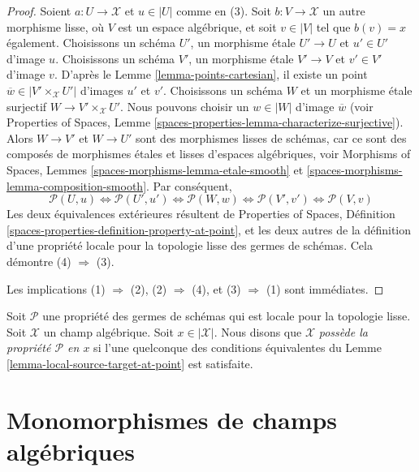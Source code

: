 \begin{proof}
Soient $a : U \to \mathcal{X}$ et $u \in |U|$ comme en (3). Soit
$b : V \to \mathcal{X}$ un autre morphisme lisse, où $V$ est un espace
algébrique, et soit $v \in |V|$ tel que $b(v) = x$ également.
Choisissons un schéma $U'$, un morphisme \'etale $U' \to U$ et $u' \in U'$
d'image $u$. Choisissons un schéma $V'$, un morphisme \'etale $V' \to V$
et $v' \in V'$ d'image $v$. D'après le
Lemme \ref{lemma-points-cartesian},
il existe un point $\overline{w} \in |V' \times_\mathcal{X} U'|$
d'images $u'$ et $v'$. Choisissons un schéma $W$ et un morphisme \'etale surjectif
$W \to V' \times_\mathcal{X} U'$. Nous pouvons choisir un
$w \in |W|$ d'image $\overline{w}$ (voir
Properties of Spaces,
Lemme \ref{spaces-properties-lemma-characterize-surjective}).
Alors $W \to V'$ et $W \to U'$ sont des morphismes lisses de schémas,
car ce sont des composés de morphismes \'etales et lisses d'espaces algébriques, voir
Morphisms of Spaces, Lemmes \ref{spaces-morphisms-lemma-etale-smooth} et
\ref{spaces-morphisms-lemma-composition-smooth}.
Par conséquent,
$$
\mathcal{P}(U, u)
\Leftrightarrow
\mathcal{P}(U', u')
\Leftrightarrow
\mathcal{P}(W, w)
\Leftrightarrow
\mathcal{P}(V', v')
\Leftrightarrow
\mathcal{P}(V, v)
$$
Les deux équivalences extérieures résultent de
Properties of Spaces,
Définition \ref{spaces-properties-definition-property-at-point},
et les deux autres de la définition d'une propriété locale pour la topologie lisse
des germes de schémas. Cela démontre (4) $\Rightarrow$ (3).

\medskip\noindent
Les implications (1) $\Rightarrow$ (2), (2) $\Rightarrow$ (4),
et (3) $\Rightarrow$ (1) sont immédiates.
\end{proof}

\begin{definition}
\label{definition-property-at-point}
Soit $\mathcal{P}$ une propriété des germes de schémas qui est
locale pour la topologie lisse. Soit $\mathcal{X}$ un champ algébrique.
Soit $x \in |\mathcal{X}|$.
Nous disons que $\mathcal{X}$ {\it possède la propriété $\mathcal{P}$ en $x$}
si l'une quelconque des conditions équivalentes du
Lemme \ref{lemma-local-source-target-at-point}
est satisfaite.
\end{definition}










\section{Monomorphismes de champs algébriques}
\label{section-monomorphisms}

